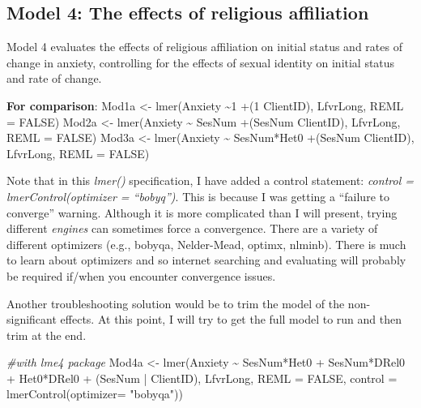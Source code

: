 \documentclass[
  11pt,
]{book}
\newenvironment{Shaded}{\begin{snugshade}}{\end{snugshade}}
\newcommand{\AttributeTok}[1]{\textcolor[rgb]{0.77,0.63,0.00}{#1}}
\newcommand{\CommentTok}[1]{\textcolor[rgb]{0.56,0.35,0.01}{\textit{#1}}}
\newcommand{\ConstantTok}[1]{\textcolor[rgb]{0.00,0.00,0.00}{#1}}
\newcommand{\FunctionTok}[1]{\textcolor[rgb]{0.00,0.00,0.00}{#1}}
\newcommand{\NormalTok}[1]{#1}
\newcommand{\OtherTok}[1]{\textcolor[rgb]{0.56,0.35,0.01}{#1}}
\newcommand{\SpecialCharTok}[1]{\textcolor[rgb]{0.00,0.00,0.00}{#1}}
\newcommand{\StringTok}[1]{\textcolor[rgb]{0.31,0.60,0.02}{#1}}
\begin{document}
\hypertarget{model-4-the-effects-of-religious-affiliation}{%
\subsection{Model 4: The effects of religious affiliation}\label{model-4-the-effects-of-religious-affiliation}}

Model 4 evaluates the effects of religious affiliation on initial status and rates of change in anxiety, controlling for the effects of sexual identity on initial status and rate of change.

\textbf{For comparison}:
Mod1a \textless- lmer(Anxiety \textasciitilde1 +(1 \textbar{} ClientID), LfvrLong, REML = FALSE)
Mod2a \textless- lmer(Anxiety \textasciitilde{} SesNum +(SesNum \textbar{} ClientID), LfvrLong, REML = FALSE)
Mod3a \textless- lmer(Anxiety \textasciitilde{} SesNum*Het0 +(SesNum \textbar{} ClientID), LfvrLong, REML = FALSE)

Note that in this \emph{lmer()} specification, I have added a control statement: \emph{control = lmerControl(optimizer = ``bobyq'')}. This is because I was getting a ``failure to converge'' warning. Although it is more complicated than I will present, trying different \emph{engines} can sometimes force a convergence. There are a variety of different optimizers (e.g., bobyqa, Nelder-Mead, optimx, nlminb). There is much to learn about optimizers and so internet searching and evaluating will probably be required if/when you encounter convergence issues.

Another troubleshooting solution would be to trim the model of the non-significant effects. At this point, I will try to get the full model to run and then trim at the end.

\begin{Shaded}
\begin{Highlighting}[]
\CommentTok{\#with lme4 package}
\NormalTok{Mod4a }\OtherTok{\textless{}{-}} \FunctionTok{lmer}\NormalTok{(Anxiety }\SpecialCharTok{\textasciitilde{}}\NormalTok{ SesNum}\SpecialCharTok{*}\NormalTok{Het0 }\SpecialCharTok{+}\NormalTok{ SesNum}\SpecialCharTok{*}\NormalTok{DRel0 }\SpecialCharTok{+}\NormalTok{ Het0}\SpecialCharTok{*}\NormalTok{DRel0 }\SpecialCharTok{+}\NormalTok{ (SesNum }\SpecialCharTok{|}\NormalTok{ ClientID), LfvrLong, }\AttributeTok{REML =} \ConstantTok{FALSE}\NormalTok{, }\AttributeTok{control =} \FunctionTok{lmerControl}\NormalTok{(}\AttributeTok{optimizer=} \StringTok{"bobyqa"}\NormalTok{))}
\end{Highlighting}
\end{Shaded}
\end{document}
